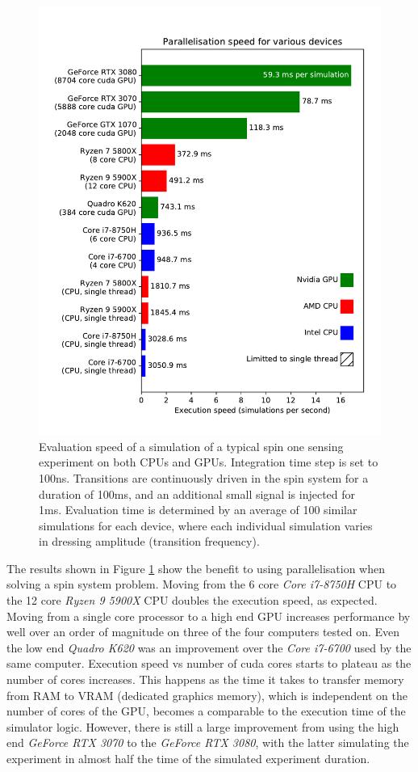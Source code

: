 \documentclass{jors}
\begin{document}
			\begin{figure}[htbp!]
				\centering
				\includegraphics[scale=0.7]{benchmark_device_aggregate.pdf}
				\caption{Evaluation speed of a simulation of a typical spin one sensing experiment on both CPUs and GPUs. Integration time step is set to 100ns. Transitions are continuously driven in the spin system for a duration of 100ms, and an additional small signal is injected for 1ms. Evaluation time is determined by an average of 100 similar simulations for each device, where each individual simulation varies in dressing amplitude (transition frequency).}
				\label{fig:benchmark_device_aggregate}
			\end{figure}

			The results shown in Figure \ref{fig:benchmark_device_aggregate} show the benefit to using parallelisation when solving a spin system problem. Moving from the 6 core \emph{Core i7-8750H} CPU to the 12 core \emph{Ryzen 9 5900X} CPU doubles the execution speed, as expected. Moving from a single core processor to a high end GPU increases performance by well over an order of magnitude on three of the four computers tested on. Even the low end \emph{Quadro K620} was an improvement over the \emph{Core i7-6700} used by the same computer. Execution speed vs number of cuda cores starts to plateau as the number of cores increases. This happens as the time it takes to transfer memory from RAM to VRAM (dedicated graphics memory), which is independent on the number of cores of the GPU, becomes a comparable to the execution time of the simulator logic. However, there is still a large improvement from using the high end \emph{GeForce RTX 3070} to the \emph{GeForce RTX 3080}, with the latter simulating the experiment in almost half the time of the simulated experiment duration.
\end{document}
